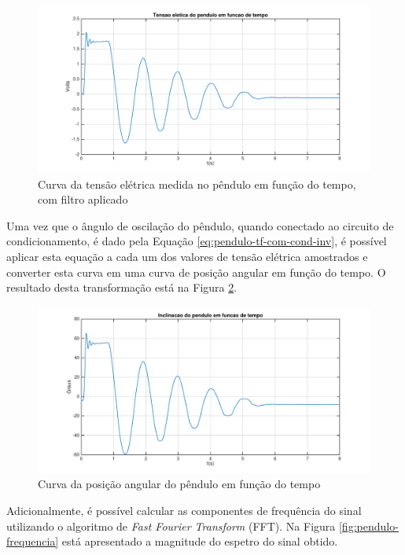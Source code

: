 \documentclass[a4paper]{instrumentacao}
\begin{document}
\begin{figure}[H]
\centering
\includegraphics[width=\textwidth]{time-plot.pdf}
\caption{Curva da tensão elétrica medida no pêndulo em função do tempo, com filtro aplicado}
\label{fig:pendulo-curva-tensao-vs-tempo-filtrado}
\end{figure}

Uma vez que o ângulo de oscilação do pêndulo, quando conectado ao circuito de condicionamento, é dado pela Equação \ref{eq:pendulo-tf-com-cond-inv}, é possível aplicar esta equação a cada um dos valores de tensão elétrica amostrados e converter esta curva em uma curva de posição angular em função do tempo. O resultado desta transformação está na Figura \ref{fig:pendulo-curva-angulo-vs-tempo}. 

\begin{figure}[H]
\centering
\includegraphics[width=\textwidth]{angle-time-plot.pdf}
\caption{Curva da posição angular do pêndulo em função do tempo}
\label{fig:pendulo-curva-angulo-vs-tempo}
\end{figure}

Adicionalmente, é possível calcular as componentes de frequência do sinal utilizando o algoritmo de \textit{Fast Fourier Transform} (FFT). Na Figura \ref{fig:pendulo-frequencia} está apresentado a magnitude do espetro do sinal obtido.
\end{document}
